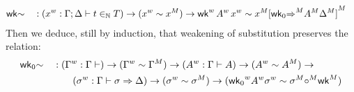 \begin{alignat*}{5}
  & \mathsf{wk}{\sim} && :
  ({x}^w : \Gamma;\Delta \vdash t\in_{\mathbb{N}} T) \rightarrow
  ({x}^w \sim {x}^M) \rightarrow
  {\mathsf{wk}}^w\,{A}^w\,{x}^w\sim{x}^M{[{\mathsf{wk}_0{\Rightarrow}}^M{A}^M{\Delta}^M]}^M
\end{alignat*}
Then we deduce, still by induction, that weakening of substitution preserves the
relation:
\begin{alignat*}{5}
  & \mathsf{wk}_0{\sim} && :
  ({\Gamma}^w : \Gamma \vdash) \rightarrow
  ({\Gamma}^w \sim {\Gamma}^M) \rightarrow
  ({A}^w : \Gamma \vdash A) \rightarrow
  ({A}^w \sim {A}^M) \rightarrow
  \\
  &&& \qquad
  ({\sigma}^w : \Gamma\vdash \sigma \Rightarrow \Delta) \rightarrow
  ({\sigma}^w \sim {\sigma}^M) \rightarrow
  ({\mathsf{wk}_0}^w{A}^w{\sigma}^w \sim {\sigma}^M{\circ}^M{\mathsf{wk}}^M)
  \end{alignat*}




